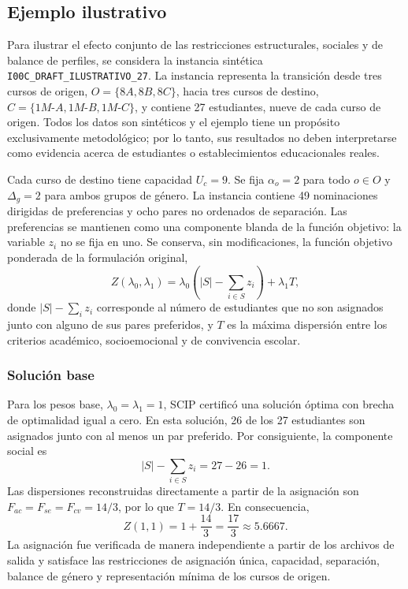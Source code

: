 
\subsection{Ejemplo ilustrativo}
\label{sec:i00c-illustrative-example}

Para ilustrar el efecto conjunto de las restricciones estructurales, sociales
y de balance de perfiles, se considera la instancia sintética
\texttt{I00C\_DRAFT\_ILUSTRATIVO\_27}. La instancia representa la transición
desde tres cursos de origen, $O=\{8A,8B,8C\}$, hacia tres cursos de destino,
$C=\{1M\text{-}A,1M\text{-}B,1M\text{-}C\}$, y contiene 27 estudiantes,
nueve de cada curso de origen. Todos los datos son sintéticos y el ejemplo
tiene un propósito exclusivamente metodológico; por lo tanto, sus resultados
no deben interpretarse como evidencia acerca de estudiantes o establecimientos
educacionales reales.

Cada curso de destino tiene capacidad $U_c=9$. Se fija $\alpha_o=2$ para todo
$o\in O$ y $\Delta_g=2$ para ambos grupos de género. La instancia contiene 49
nominaciones dirigidas de preferencias y ocho pares no ordenados de separación.
Las preferencias se mantienen como una componente blanda de la función objetivo:
la variable $z_i$ no se fija en uno. Se conserva, sin modificaciones, la función
objetivo ponderada de la formulación original,
\begin{equation}
  Z(\lambda_0,\lambda_1)
  = \lambda_0\left(|S|-\sum_{i\in S}z_i\right)+\lambda_1 T,
  \label{eq:i00c-weighted-objective}
\end{equation}
donde $|S|-\sum_i z_i$ corresponde al número de estudiantes que no son
asignados junto con alguno de sus pares preferidos, y $T$ es la máxima
dispersión entre los criterios académico, socioemocional y de convivencia
escolar.

\subsubsection{Solución base}
\label{sec:i00c-baseline-solution}

Para los pesos base, $\lambda_0=\lambda_1=1$, SCIP certificó una solución
óptima con brecha de optimalidad igual a cero. En esta solución, 26 de los 27
estudiantes son asignados junto con al menos un par preferido. Por consiguiente,
la componente social es
\[
  |S|-\sum_{i\in S}z_i=27-26=1.
\]
Las dispersiones reconstruidas directamente a partir de la asignación son
$F_{ac}=F_{se}=F_{cv}=14/3$, por lo que $T=14/3$. En consecuencia,
\begin{equation}
  Z(1,1)=1+\frac{14}{3}=\frac{17}{3}\approx 5.6667.
  \label{eq:i00c-baseline-value}
\end{equation}
La asignación fue verificada de manera independiente a partir de los archivos
de salida y satisface las restricciones de asignación única, capacidad,
separación, balance de género y representación mínima de los cursos de origen.

